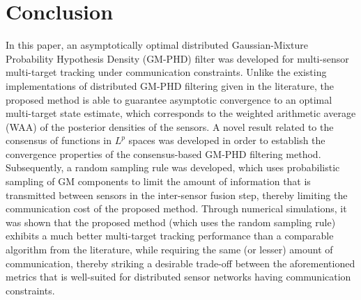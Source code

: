 \section{Conclusion}
\label{sec:conclusion}

In this paper, an asymptotically optimal distributed Gaussian-Mixture Probability Hypothesis Density (GM-PHD) filter was developed for multi-sensor multi-target tracking under communication constraints. Unlike the existing implementations of distributed GM-PHD filtering given in the literature, the proposed method is able to guarantee asymptotic convergence to an optimal multi-target state estimate, which corresponds to the weighted arithmetic average (WAA) of the posterior densities of the sensors. A novel result related to the consensus of functions in $L^p$ spaces was developed in order to establish the convergence properties of the consensus-based GM-PHD filtering method. Subsequently, a random sampling rule was developed, which uses probabilistic sampling of GM components to limit the amount of information that is transmitted between sensors in the inter-sensor fusion step, thereby limiting the communication cost of the proposed method. Through numerical simulations, it was shown that the proposed method (which uses the random sampling rule) exhibits a much better multi-target tracking performance than a comparable algorithm from the literature, while requiring the same (or lesser) amount of communication, thereby striking a desirable trade-off between the aforementioned metrics that is well-suited for distributed sensor networks having communication constraints.
